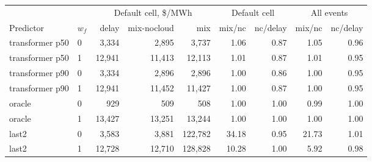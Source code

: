 \begin{tabular}{llrrrrrrr}
\toprule
 & & \multicolumn{3}{c}{Default cell, \$/MWh} & \multicolumn{2}{c}{Default cell} & \multicolumn{2}{c}{All events} \\
Predictor & $w_f$ & delay & mix-nocloud & mix & mix/nc & nc/delay & mix/nc & nc/delay \\
\midrule
transformer p50 & 0 & 3,334 & 2,895 & 3,737 & 1.06 & 0.87 & 1.05 & 0.96 \\
transformer p50 & 1 & 12,941 & 11,413 & 12,113 & 1.01 & 0.87 & 1.01 & 0.95 \\
transformer p90 & 0 & 3,334 & 2,896 & 2,896 & 1.00 & 0.86 & 1.00 & 0.95 \\
transformer p90 & 1 & 12,941 & 11,452 & 11,427 & 1.00 & 0.87 & 1.00 & 0.95 \\
oracle & 0 & 929 & 509 & 508 & 1.00 & 1.00 & 0.99 & 1.00 \\
oracle & 1 & 13,427 & 13,251 & 13,244 & 1.00 & 1.00 & 1.00 & 1.00 \\
last2 & 0 & 3,583 & 3,881 & 122,782 & 34.18 & 0.95 & 21.73 & 1.01 \\
last2 & 1 & 12,728 & 12,710 & 128,828 & 10.28 & 1.00 & 5.92 & 0.98 \\
\bottomrule
\end{tabular}
